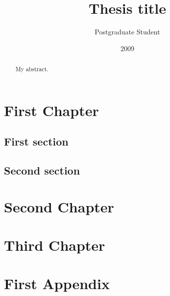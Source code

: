 \documentclass[10pt,twoside,openright]{report}
\title{Thesis title}
\author{Postgraduate Student}
\date{2009}
\begin{document}
\maketitle

\declaration

\dedication{To my ...}

\begin{abstract}
My abstract.
\end{abstract}

\tableofcontents

\chapter{First Chapter}

\section{First section}

\section{Second section}

\chapter{Second Chapter}

\chapter{Third Chapter}

\appendix

\chapter{First Appendix}
\end{document}
